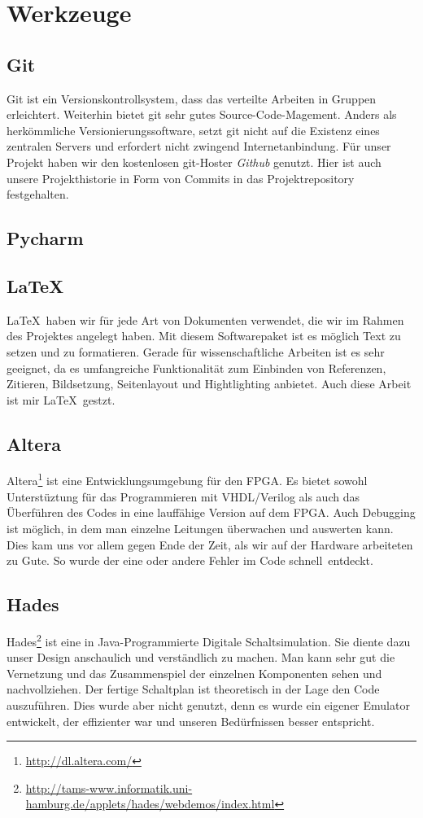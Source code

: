 \section{Werkzeuge}
\subsection{Git}
Git ist ein Versionskontrollsystem, dass das verteilte Arbeiten in Gruppen erleichtert. Weiterhin bietet git sehr gutes Source-Code-Magement. Anders als herkömmliche Versionierungssoftware, setzt git nicht auf die Existenz eines zentralen Servers und erfordert nicht zwingend Internetanbindung.
Für unser Projekt haben wir den kostenlosen git-Hoster \textit{Github} genutzt. Hier ist auch unsere Projekthistorie in Form von Commits in das Projektrepository festgehalten.

\subsection{Pycharm}

\subsection{\LaTeX}
\LaTeX \ haben wir für jede Art von Dokumenten verwendet, die wir im Rahmen des Projektes angelegt haben. Mit diesem Softwarepaket ist es möglich Text zu setzen und zu formatieren. Gerade für wissenschaftliche Arbeiten ist es sehr geeignet, da es umfangreiche Funktionalität zum Einbinden von Referenzen, Zitieren, Bildsetzung, Seitenlayout und Hightlighting anbietet. Auch diese Arbeit ist mir \LaTeX \ gestzt.

\subsection{Altera}
Altera\footnote{\url{http://dl.altera.com/}} ist eine Entwicklungsumgebung für den FPGA. Es bietet sowohl Unterstüztung für das Programmieren mit VHDL/Verilog als auch das Überführen des Codes in eine lauffähige Version auf dem FPGA. Auch Debugging ist möglich, in dem man einzelne Leitungen überwachen und auswerten kann. Dies kam uns vor allem gegen Ende der Zeit, als wir auf der Hardware arbeiteten zu Gute. So wurde der eine oder andere Fehler im Code \glqq schnell\grqq \ entdeckt. 

\subsection{Hades}
Hades\footnote{\url{http://tams-www.informatik.uni-hamburg.de/applets/hades/webdemos/index.html}} ist eine in Java-Programmierte Digitale Schaltsimulation. Sie diente dazu unser Design anschaulich und verständlich zu machen. Man kann sehr gut die Vernetzung und das Zusammenspiel der einzelnen Komponenten sehen und nachvollziehen. Der fertige Schaltplan ist theoretisch in der Lage den Code auszuführen. Dies wurde aber nicht genutzt, denn es wurde ein eigener Emulator entwickelt, der effizienter war und unseren Bedürfnissen besser entspricht.

